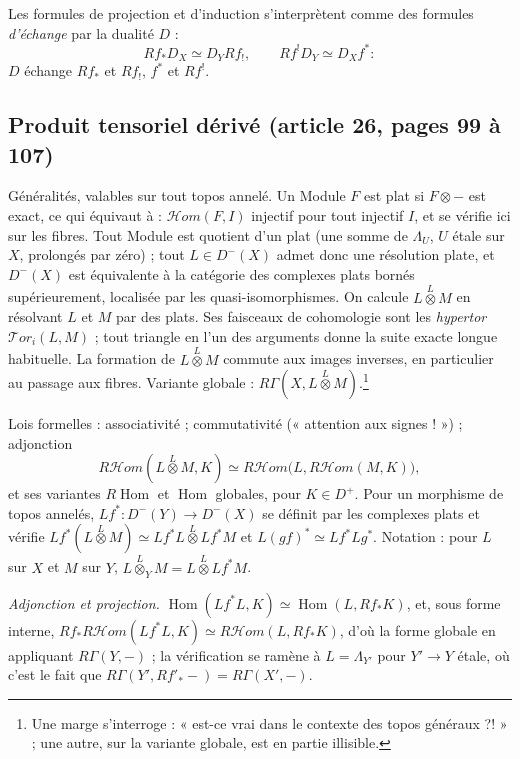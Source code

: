 \documentclass[11pt,a4paper]{article}
\begin{document}
Les formules de projection et d'induction s'interprètent comme des formules
\emph{d'échange} par la dualité $D$ :
\[
  Rf_{*}D_{X} \simeq D_{Y}Rf_{!}, \qquad Rf^{!}D_{Y} \simeq D_{X}f^{*} :
\]
$D$ échange $Rf_{*}$ et $Rf_{!}$, $f^{*}$ et $Rf^{!}$.

\subsection*{Produit tensoriel dérivé (article 26, pages 99 à 107)}

Généralités, valables sur tout topos annelé. Un Module $F$ est plat si $F
\otimes -$ est exact, ce qui équivaut à : $\mathcal{H}om(F, I)$ injectif pour
tout injectif $I$, et se vérifie ici sur les fibres. Tout Module est quotient
d'un plat (une somme de $\Lambda_{U}$, $U$ étale sur $X$, prolongés par zéro) ;
tout $L \in D^{-}(X)$ admet donc une résolution plate, et $D^{-}(X)$ est
équivalente à la catégorie des complexes plats bornés supérieurement, localisée
par les quasi-isomorphismes. On calcule $L \overset{L}{\otimes} M$ en résolvant
$L$ et $M$ par des plats. Ses faisceaux de cohomologie sont les \emph{hypertor}
$\mathcal{T}or_{i}(L, M)$ ; tout triangle en l'un des arguments donne la suite
exacte longue habituelle. La formation de $L \overset{L}{\otimes} M$ commute
aux images inverses, en particulier au passage aux fibres. Variante globale :
$R\Gamma(X, L \overset{L}{\otimes} M)$.\footnote{Une marge s'interroge : « est-ce
vrai dans le contexte des topos généraux ?! » ; une autre, sur la variante
globale, est en partie illisible.}

Lois formelles : associativité ; commutativité (« attention aux signes ! ») ;
adjonction
\[
  R\mathcal{H}om(L \overset{L}{\otimes} M, K) \simeq R\mathcal{H}om\bigl(L,
  R\mathcal{H}om(M, K)\bigr),
\]
et ses variantes $R\operatorname{Hom}$ et $\operatorname{Hom}$ globales, pour
$K \in D^{+}$. Pour un morphisme de topos annelés, $Lf^{*} : D^{-}(Y) \to
D^{-}(X)$ se définit par les complexes plats et vérifie
$Lf^{*}(L \overset{L}{\otimes} M) \simeq Lf^{*}L \overset{L}{\otimes} Lf^{*}M$
et $L(gf)^{*} \simeq Lf^{*}Lg^{*}$. Notation : pour $L$ sur $X$ et $M$ sur $Y$,
$L \overset{L}{\otimes}_{Y} M = L \overset{L}{\otimes} Lf^{*}M$.

\emph{Adjonction et projection.} $\operatorname{Hom}(Lf^{*}L, K) \simeq
\operatorname{Hom}(L, Rf_{*}K)$, et, sous forme interne,
$Rf_{*}R\mathcal{H}om(Lf^{*}L, K) \simeq R\mathcal{H}om(L, Rf_{*}K)$, d'où la
forme globale en appliquant $R\Gamma(Y, -)$ ; la vérification se ramène à $L =
\Lambda_{Y'}$ pour $Y' \to Y$ étale, où c'est le fait que $R\Gamma(Y',
Rf'_{*}-) = R\Gamma(X', -)$.
\end{document}
